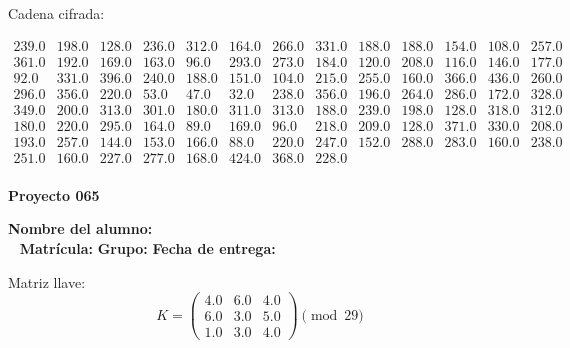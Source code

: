 \documentclass[12pt]{article}
\begin{document}
Cadena cifrada:
\begin{center}
$\begin{array}{lllllllllllll}
239.0 & 198.0 & 128.0 & 236.0 & 312.0 & 164.0 & 266.0 & 331.0 & 188.0 & 188.0 & 154.0 & 108.0 & 257.0\\
361.0 & 192.0 & 169.0 & 163.0 & 96.0 & 293.0 & 273.0 & 184.0 & 120.0 & 208.0 & 116.0 & 146.0 & 177.0\\
92.0 & 331.0 & 396.0 & 240.0 & 188.0 & 151.0 & 104.0 & 215.0 & 255.0 & 160.0 & 366.0 & 436.0 & 260.0\\
296.0 & 356.0 & 220.0 & 53.0 & 47.0 & 32.0 & 238.0 & 356.0 & 196.0 & 264.0 & 286.0 & 172.0 & 328.0\\
349.0 & 200.0 & 313.0 & 301.0 & 180.0 & 311.0 & 313.0 & 188.0 & 239.0 & 198.0 & 128.0 & 318.0 & 312.0\\
180.0 & 220.0 & 295.0 & 164.0 & 89.0 & 169.0 & 96.0 & 218.0 & 209.0 & 128.0 & 371.0 & 330.0 & 208.0\\
193.0 & 257.0 & 144.0 & 153.0 & 166.0 & 88.0 & 220.0 & 247.0 & 152.0 & 288.0 & 283.0 & 160.0 & 238.0\\
251.0 & 160.0 & 227.0 & 277.0 & 168.0 & 424.0 & 368.0 & 228.0\\
\end{array}$
\end{center}

\newpage


\textbf{Proyecto 065}

\textbf{Nombre del alumno:} \underline{\hspace{13cm}}\\\
\vspace{1cm}
\textbf{Matrícula:} \underline{\hspace{4cm}} \hspace{1cm}
\textbf{Grupo:} \underline{\hspace{2cm}}
\textbf{Fecha de entrega:} \underline{\hspace{2cm}}

\medskip

Matriz llave:
\[
K = \begin{pmatrix}
4.0 & 6.0 & 4.0\\
6.0 & 3.0 & 5.0\\
1.0 & 3.0 & 4.0
\end{pmatrix} \pmod{29}
\]
\end{document}
